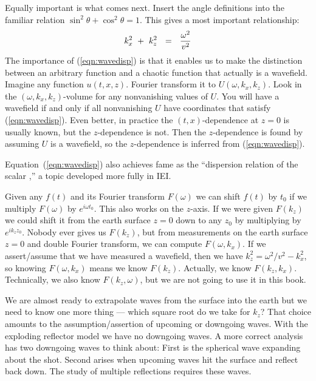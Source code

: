 \par
Equally important is what comes next.
Insert the angle definitions into the familiar
relation  $ \sin^2 \theta + \cos^2  \theta = 1 $.
This gives a most important relationship:
\begin{equation}
k_x^2 \ +\  k_z^2 \ \ =\ \  { \omega^2   \over  v^2 }
\label{eqn:wavedisp}
\end{equation}
The importance of (\ref{eqn:wavedisp}) is that it enables
us to make the distinction between
an arbitrary function and a chaotic function
that actually is a wavefield.
Imagine any function  $u(t,x,z)$.
Fourier transform it to  $U(\omega , k_x , k_z ) $.
Look in the  $ ( \omega , k_x , k_z ) $-volume for any nonvanishing
values of  $U$.
You will have a wavefield if and only if
all nonvanishing $U$ have coordinates that satisfy (\ref{eqn:wavedisp}).
Even better,
in practice the $(t,x)$-dependence at $z=0$ is usually known,
but the $z$-dependence is not.
Then the $z$-dependence is found by assuming $U$ is a wavefield,
so the $z$-dependence is inferred from (\ref{eqn:wavedisp}).
\par
Equation~(\ref{eqn:wavedisp}) also achieves fame as the
``dispersion relation of the scalar ,''
a topic developed more fully in IEI.


\par
Given any $f(t)$ and its Fourier transform $F(\omega)$
we can shift $f(t)$ by $t_0$
if we multiply $F(\omega)$ by $e^{i\omega t_0}$.
This also works on the $z$-axis.
If we were given $F(k_z)$ we could shift it from the earth surface $z=0$
down to any $z_0$ by multiplying by
$e^{ik_z z_0}$.
Nobody ever gives us $F(k_z)$,
but from measurements on the earth surface $z=0$
and double Fourier transform, we can compute $F(\omega,k_x)$.
If we assert/assume that we have measured a wavefield, then we have
$k_z^2 = \omega^2/v^2 - k_x^2$,
so knowing $F(\omega,k_x)$ means we know $F(k_z)$.
Actually, we know $F(k_z,k_x)$.
Technically, we also know $F(k_z,\omega)$, but
we are not going to use it in this book.

\par
We are almost ready to extrapolate waves from the surface into the earth
but we need to know one more thing --- which square root do
we take for $k_z$?
That choice amounts to the assumption/assertion of upcoming or
downgoing waves.
With the exploding reflector model we have no downgoing waves.
A more correct analysis has two downgoing waves to think about:
First is the spherical wave expanding about the shot.
Second arises when upcoming waves hit the surface and reflect back down.
The study of multiple reflections requires these waves.


